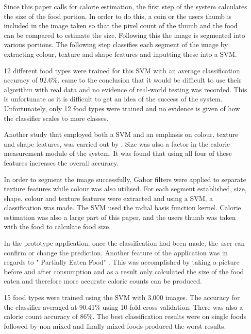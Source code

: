 Since this paper calls for calorie estimation, the first step of the system calculates the size of the food portion. In order to do this, a coin or the users thumb is included in the image taken so that the pixel count of the thumb and the food can be compared to estimate the size. Following this the image is segmented into various portions. The following step classifies each segment of the image by extracting colour, texture and shape features and inputting these into a SVM.

12 different food types were trained for this SVM with an average classification accuracy of 92.6\%.
\parencite{novelSVM} came to the conclusion that it would be difficult to use their algorithm with real data and no evidence of real-world testing was recorded.
This is unfortunate as it is difficult to get an idea of the success of the system.
Unfortunately, only 12 food types were trained and no evidence is given of how the classifier scales to more classes.

Another study that employed both a SVM and an emphasis on colour, texture and shape features, was carried out by \parencite{pouladzadeh2014measuring}.
Size was also a factor in the calorie measurement module of the system. It was found that using all four of these features increases the overall accuracy.

In order to segment the image successfully, Gabor filters were applied to separate texture features while colour was also utilised. For each segment established, size, shape, colour and texture features were extracted and using a SVM, a classification was made. The SVM used the radial basis function kernel.
Calorie estimation was also a large part of this paper, and the users thumb was taken with the food to calculate food size.

In the prototype application, once the classification had been made, the user can confirm or change the prediction. Another feature of the application was in regards to " Partially Eaten Food" \parencite{pouladzadeh2014measuring}. This was accomplished by taking a picture before and after consumption and as a result only calculated the size of the food eaten and therefore more accurate calorie counts can be produced.

15 food types were trained using the SVM with 3,000 images. The accuracy for the classifier averaged at 90.41\% using 10-fold cross-validation.
There was also a calorie count accuracy of 86\%. The best classification results were on single foods followed by non-mixed and finally mixed foods produced the worst results.


